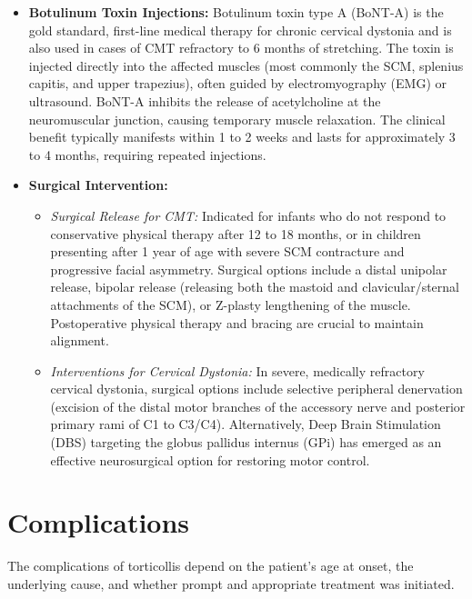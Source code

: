 \begin{itemize}
\begin{itemize}
    \end{itemize}
    \item \textbf{Botulinum Toxin Injections:} Botulinum toxin type A (BoNT-A) is the gold standard, first-line medical therapy for chronic cervical dystonia and is also used in cases of CMT refractory to 6 months of stretching. The toxin is injected directly into the affected muscles (most commonly the SCM, splenius capitis, and upper trapezius), often guided by electromyography (EMG) or ultrasound. BoNT-A inhibits the release of acetylcholine at the neuromuscular junction, causing temporary muscle relaxation. The clinical benefit typically manifests within 1 to 2 weeks and lasts for approximately 3 to 4 months, requiring repeated injections.
    \item \textbf{Surgical Intervention:}
    \begin{itemize}
        \item \textit{Surgical Release for CMT:} Indicated for infants who do not respond to conservative physical therapy after 12 to 18 months, or in children presenting after 1 year of age with severe SCM contracture and progressive facial asymmetry. Surgical options include a distal unipolar release, bipolar release (releasing both the mastoid and clavicular/sternal attachments of the SCM), or Z-plasty lengthening of the muscle. Postoperative physical therapy and bracing are crucial to maintain alignment.
        \item \textit{Interventions for Cervical Dystonia:} In severe, medically refractory cervical dystonia, surgical options include selective peripheral denervation (excision of the distal motor branches of the accessory nerve and posterior primary rami of C1 to C3/C4). Alternatively, Deep Brain Stimulation (DBS) targeting the globus pallidus internus (GPi) has emerged as an effective neurosurgical option for restoring motor control.
    \end{itemize}
\end{itemize}

\section*{Complications}
The complications of torticollis depend on the patient's age at onset, the underlying cause, and whether prompt and appropriate treatment was initiated.


